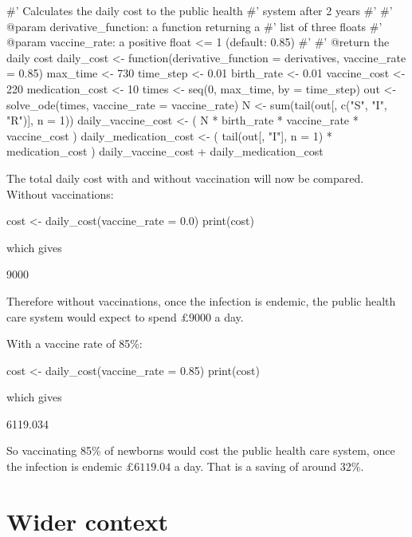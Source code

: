 \begin{Rin}
#' Calculates the daily cost to the public health
#' system after 2 years
#'
#' @param derivative_function: a function returning a
#'                             list of three floats
#' @param vaccine_rate: a positive float <= 1 (default: 0.85)
#'
#' @return the daily cost
daily_cost <- function(derivative_function = derivatives,
                       vaccine_rate = 0.85){
  max_time <- 730
  time_step <- 0.01
  birth_rate <- 0.01
  vaccine_cost <- 220
  medication_cost <- 10
  times <- seq(0, max_time, by = time_step)
  out <- solve_ode(times, vaccine_rate = vaccine_rate)
  N <- sum(tail(out[, c("S", "I", "R")], n = 1))
  daily_vaccine_cost <- (
    N * birth_rate * vaccine_rate * vaccine_cost
  )
  daily_medication_cost <- (
    tail(out[, "I"], n = 1) * medication_cost
  )
  daily_vaccine_cost + daily_medication_cost
}
\end{Rin}

The total daily cost with and without vaccination will now be compared. Without
vaccinations:

\begin{Rin}
cost <- daily_cost(vaccine_rate = 0.0)
print(cost)
\end{Rin}

which gives

\begin{Rout}
[1] 9000
\end{Rout}

Therefore without vaccinations, once the infection is endemic, the public health
care system would expect to spend $\pounds 9000$ a day.

With a vaccine rate of 85\%:

\begin{Rin}
cost <- daily_cost(vaccine_rate = 0.85)
print(cost)
\end{Rin}

which gives

\begin{Rout}
[1] 6119.034
\end{Rout}

So vaccinating 85\% of newborns would cost the public health care system, once
the infection is endemic $\pounds 6119.04$ a day. That is a saving of around
32\%.

\section{Wider context}\label{sec:system_dynamics_wider_context}

